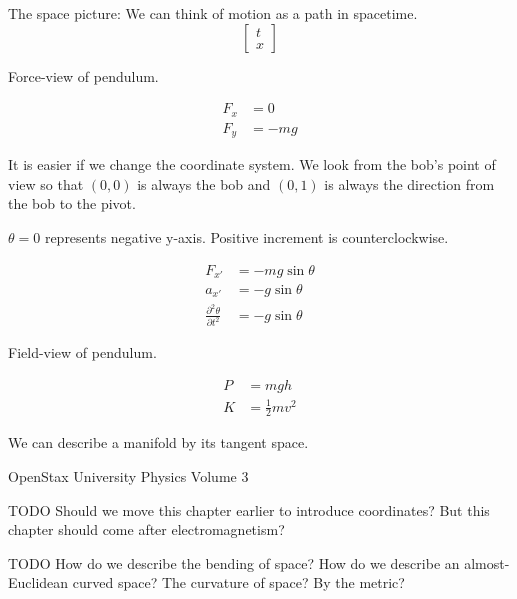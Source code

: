 The space picture:
We can think of motion as a path in spacetime.
\[
\begin{bmatrix}t\\x\end{bmatrix}
\]

Force-view of pendulum.

\begin{align*}
F_x &= 0
\\
F_y &= -mg
\end{align*}

It is easier if we change the coordinate system.
We look from the bob's point of view
so that $(0,0)$ is always the bob
and $(0,1)$ is always the direction from the bob to the pivot.

$\theta=0$ represents negative y-axis.
Positive increment is counterclockwise.

\begin{align*}
F_{x'} &= -m g \sin \theta
\\ a_{x'} &= -g \sin \theta
\\ \frac{\partial^2 \theta}{\partial t^2} &= -g \sin \theta
\end{align*}

Field-view of pendulum.

\begin{align*}
P &= m g h
\\
K &= \frac{1}{2} m v^2
\end{align*}

We can describe a manifold by its tangent space.




OpenStax University Physics Volume 3 \cite{openstaxphysics3}

TODO
Should we move this chapter earlier to introduce coordinates?
But this chapter should come after electromagnetism?

TODO
How do we describe the bending of space?
How do we describe an almost-Euclidean curved space?
The curvature of space?
By the metric?

